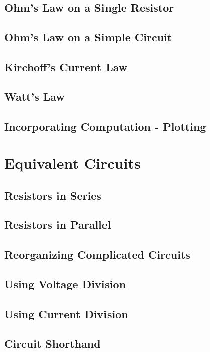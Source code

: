 \documentclass[a4paper,11pt]{book}
\begin{document}
\section{Ohm's Law on a Single Resistor}

\section{Ohm's Law on a Simple Circuit} \label{sec:FL_simpleCircuit}

\section{Kirchoff's Current Law}

\section{Watt's Law}

\section{Incorporating Computation - Plotting}
\chapter{Equivalent Circuits}

\section{Resistors in Series}

\section{Resistors in Parallel}

\section{Reorganizing Complicated Circuits}

\section{Using Voltage Division}

\section{Using Current Division}

\section{Circuit Shorthand}

\end{document}
